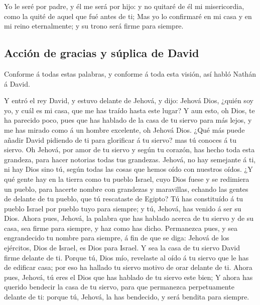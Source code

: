 Yo le seré por padre, y él me será por hijo: y no
quitaré de él mi misericordia, como la quité de aquel que fué antes de
ti;  Mas yo lo confirmaré en mi casa y en mi reino
eternalmente; y su trono será firme para siempre.

\hypertarget{acciuxf3n-de-gracias-y-suxfaplica-de-david}{%
\subsection{Acción de gracias y súplica de
David}\label{acciuxf3n-de-gracias-y-suxfaplica-de-david}}

 Conforme á todas estas palabras, y conforme á toda esta
visión, así habló Nathán á David.

 Y entró el rey David, y estuvo delante de Jehová, y
dijo: Jehová Dios, ¿quién soy yo, y cuál es mi casa, que me has traído
hasta este lugar?  Y aun esto, oh Dios, te ha parecido
poco, pues que has hablado de la casa de tu siervo para más lejos, y me
has mirado como á un hombre excelente, oh Jehová Dios. 
¿Qué más puede añadir David pidiendo de ti para glorificar á tu siervo?
mas tú conoces á tu siervo.  Oh Jehová, por amor de tu
siervo y según tu corazón, has hecho toda esta grandeza, para hacer
notorias todas tus grandezas.  Jehová, no hay semejante á
ti, ni hay Dios sino tú, según todas las cosas que hemos oído con
nuestros oídos.  ¿Y qué gente hay en la tierra como tu
pueblo Israel, cuyo Dios fuese y se redimiera un pueblo, para hacerte
nombre con grandezas y maravillas, echando las gentes de delante de tu
pueblo, que tú rescataste de Egipto?  Tú has constituído
á tu pueblo Israel por pueblo tuyo para siempre; y tú, Jehová, has
venido á ser su Dios.  Ahora pues, Jehová, la palabra que
has hablado acerca de tu siervo y de su casa, sea firme para siempre, y
haz como has dicho.  Permanezca pues, y sea engrandecido
tu nombre para siempre, á fin de que se diga: Jehová de los ejércitos,
Dios de Israel, es Dios para Israel. Y sea la casa de tu siervo David
firme delante de ti.  Porque tú, Dios mío, revelaste al
oído á tu siervo que le has de edificar casa; por eso ha hallado tu
siervo motivo de orar delante de ti.  Ahora pues, Jehová,
tú eres el Dios que has hablado de tu siervo este bien; 
Y ahora has querido bendecir la casa de tu siervo, para que permanezca
perpetuamente delante de ti: porque tú, Jehová, la has bendecido, y será
bendita para siempre.

